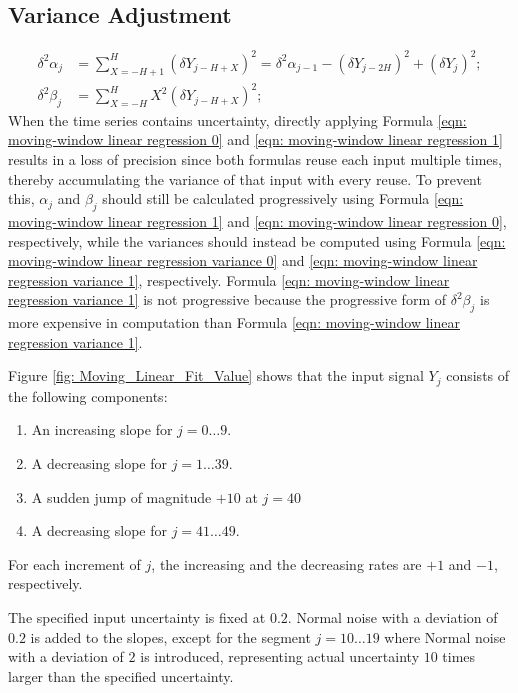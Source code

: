 \documentclass[twoside]{article}
\numberwithin{equation}{section}
\begin{document}
\subsection{Variance Adjustment} 

\begin{align}
\label{eqn: moving-window linear regression variance 0}
\delta^2 \alpha_{j} &= \sum_{X=-H+1}^{H} (\delta Y_{j-H+X})^2 = \delta^2 \alpha_{j-1} - (\delta Y_{j-2H})^2 + (\delta Y_{j})^2; \\
\label{eqn: moving-window linear regression variance 1}
\delta^2 \beta_{j} &= \sum_{X=-H}^{H} X^2 (\delta Y_{j-H+X})^2;
\end{align}
When the time series contains uncertainty, directly applying Formula \eqref{eqn: moving-window linear regression 0} and \eqref{eqn: moving-window linear regression 1} results in a loss of precision since both formulas reuse each input multiple times, thereby accumulating the variance of that input with every reuse.
To prevent this, $\alpha_j$ and $\beta_j$ should still be calculated progressively using Formula \eqref{eqn: moving-window linear regression 1} and \eqref{eqn: moving-window linear regression 0}, respectively, while the variances should instead be computed using Formula \eqref{eqn: moving-window linear regression variance 0} and \eqref{eqn: moving-window linear regression variance 1}, respectively.
Formula \eqref{eqn: moving-window linear regression variance 1} is not progressive because the progressive form of $\delta^2 \beta_j$ is more  expensive in computation than Formula \eqref{eqn: moving-window linear regression variance 1}.

Figure \ref{fig: Moving_Linear_Fit_Value} shows that the input signal $Y_j$ consists of the following components:
\begin{enumerate}
\item An increasing slope for $j = 0 \dots 9$.

\item A decreasing slope for $j = 1 \dots 39$.

\item A sudden jump of magnitude $+10$ at $j=40$

\item A decreasing slope for $j = 41 \dots 49$.
\end{enumerate}
For each increment of $j$, the increasing and the decreasing rates are $+1$ and $-1$, respectively.

The specified input uncertainty is fixed at $0.2$.
Normal noise with a deviation of $0.2$  is added to the slopes, except for the segment $j = 10 \dots 19$ where Normal noise with a deviation of $2$ is introduced, representing actual uncertainty $10$ times larger than the specified uncertainty.
\end{document}
